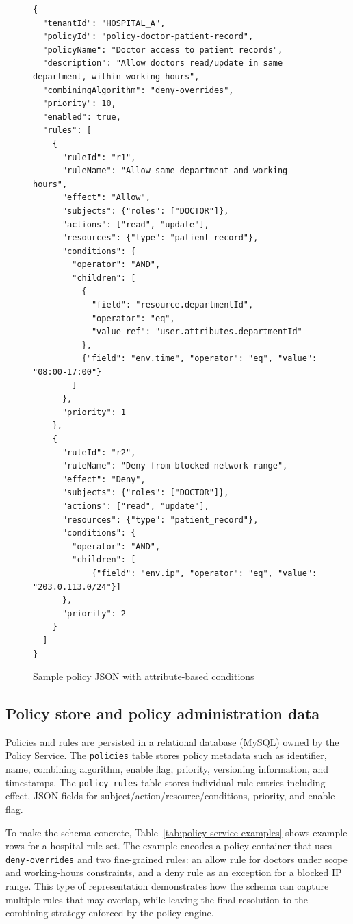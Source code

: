 \begin{figure}[H]
\centering
\small
\begin{verbatim}
{
  "tenantId": "HOSPITAL_A",
  "policyId": "policy-doctor-patient-record",
  "policyName": "Doctor access to patient records",
  "description": "Allow doctors read/update in same department, within working hours",
  "combiningAlgorithm": "deny-overrides",
  "priority": 10,
  "enabled": true,
  "rules": [
    {
      "ruleId": "r1",
      "ruleName": "Allow same-department and working hours",
      "effect": "Allow",
      "subjects": {"roles": ["DOCTOR"]},
      "actions": ["read", "update"],
      "resources": {"type": "patient_record"},
      "conditions": {
        "operator": "AND",
        "children": [
          {
            "field": "resource.departmentId",
            "operator": "eq",
            "value_ref": "user.attributes.departmentId"
          },
          {"field": "env.time", "operator": "eq", "value": "08:00-17:00"}
        ]
      },
      "priority": 1
    },
    {
      "ruleId": "r2",
      "ruleName": "Deny from blocked network range",
      "effect": "Deny",
      "subjects": {"roles": ["DOCTOR"]},
      "actions": ["read", "update"],
      "resources": {"type": "patient_record"},
      "conditions": {
        "operator": "AND",
        "children": [
            {"field": "env.ip", "operator": "eq", "value": "203.0.113.0/24"}]
      },
      "priority": 2
    }
  ]
}
\end{verbatim}
\caption{Sample policy JSON with attribute-based conditions}
\label{lst:policy-json}
\end{figure}



\subsection{Policy store and policy administration data}
\label{sec:policy-store}

Policies and rules are persisted in a relational database (MySQL) owned by the Policy Service. The \texttt{policies} table stores policy metadata such as identifier, name, combining algorithm, enable flag, priority, versioning information, and timestamps. The \texttt{policy\_rules} table stores individual rule entries including effect, JSON fields for subject/action/resource/conditions, priority, and enable flag.

\vspace{0.5cm}

To make the schema concrete, Table~\ref{tab:policy-service-examples} shows example rows for a hospital rule set. The example encodes a policy container that uses \texttt{deny-overrides} and two fine-grained rules: an allow rule for doctors under scope and working-hours constraints, and a deny rule as an exception for a blocked IP range. This type of representation demonstrates how the schema can capture multiple rules that may overlap, while leaving the final resolution to the combining strategy enforced by the policy engine.

